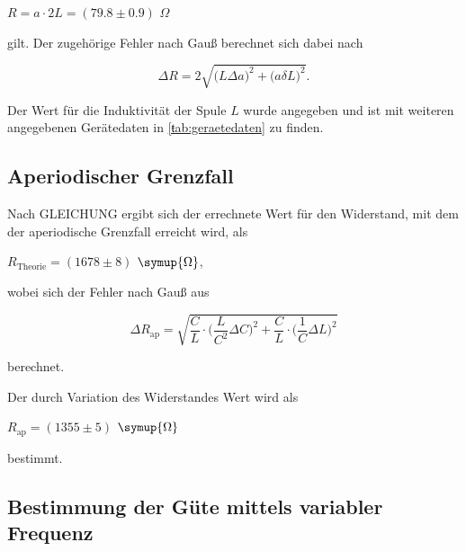 \begin{center}
    $R = a \cdot 2L = (79.8 \pm 0.9)$ $\Omega$
\end{center}

gilt. Der zugehörige Fehler nach Gauß berechnet sich dabei nach

\begin{equation}
    \Delta R = 2 \sqrt{ \bigg( L \Delta a \bigg)^2 + \bigg( a \delta L \bigg)^2 }.
\end{equation}

Der Wert für die Induktivität der Spule $L$ wurde angegeben und ist mit weiteren angegebenen Gerätedaten in \autoref{ŧab:geraetedaten} zu finden.



\subsection{Aperiodischer Grenzfall}

Nach GLEICHUNG ergibt sich der errechnete Wert für den Widerstand, mit dem der aperiodische Grenzfall erreicht wird, als

\begin{center}
    $R_\text{Theorie} = (1678 \pm 8)$ $\symup{\Omega}$,
\end{center}

wobei sich der Fehler nach Gauß aus %

\begin{equation}
    \Delta R_\text{ap} = \sqrt{ \frac{C}{L} \cdot \bigg( \frac{L}{C^2} \Delta C \bigg)^2 + \frac{C}{L} \cdot \bigg( \frac{1}{C} \Delta L \bigg)^2 }
\end{equation}

berechnet.

Der durch Variation des Widerstandes Wert wird als

\begin{center}
    $R_\text{ap} = (1355 \pm 5)$ $\symup{\Omega}$
\end{center}

bestimmt.

\subsection{Bestimmung der Güte mittels variabler Frequenz}



